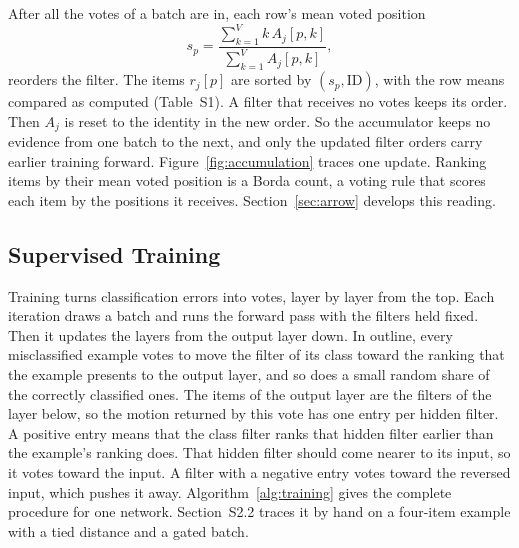 After all the votes of a batch are in, each row's mean voted position
\begin{equation}
s_p=\frac{\sum_{k=1}^{V}k\,A_j[p,k]}{\sum_{k=1}^{V}A_j[p,k]},
\label{eq:rowmean}
\end{equation}
reorders the filter. The items $r_j[p]$ are sorted by $(s_p,\mathrm{ID})$, with the row means compared as computed (Table~S1). A filter that receives no votes keeps its order. Then $A_j$ is reset to the identity in the new order. So the accumulator keeps no evidence from one batch to the next, and only the updated filter orders carry earlier training forward. Figure~\ref{fig:accumulation} traces one update. Ranking items by their mean voted position is a Borda count, a voting rule that scores each item by the positions it receives. Section~\ref{sec:arrow} develops this reading.

\subsection{Supervised Training}\label{sec:training}

Training turns classification errors into votes, layer by layer from the top. Each iteration draws a batch and runs the forward pass with the filters held fixed. Then it updates the layers from the output layer down. In outline, every misclassified example votes to move the filter of its class toward the ranking that the example presents to the output layer, and so does a small random share of the correctly classified ones. The items of the output layer are the filters of the layer below, so the motion returned by this vote has one entry per hidden filter. A positive entry means that the class filter ranks that hidden filter earlier than the example's ranking does. That hidden filter should come nearer to its input, so it votes toward the input. A filter with a negative entry votes toward the reversed input, which pushes it away. Algorithm~\ref{alg:training} gives the complete procedure for one network. Section~S2.2 traces it by hand on a four-item example with a tied distance and a gated batch.

